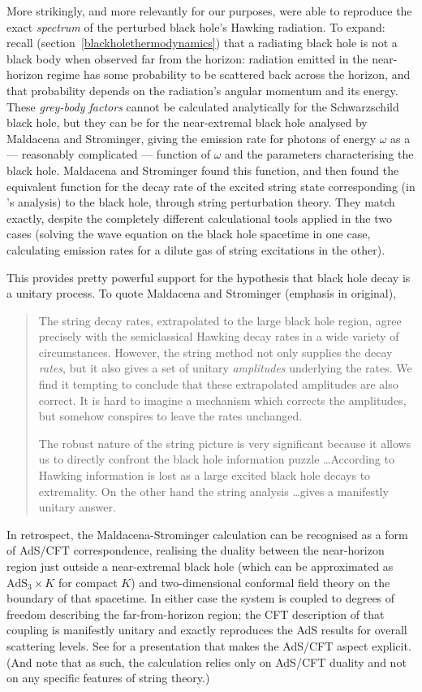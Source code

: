 \documentclass[12pt]{article}
\newcommand{\AdS}{\mbox{AdS}}
\begin{document}
More strikingly, and more relevantly for our purposes,  were able to reproduce the exact \emph{spectrum} of the perturbed black hole's Hawking radiation. To expand: recall (section~\ref{blackholethermodynamics}) that a radiating black hole is not  a black body when observed far from the horizon: radiation emitted in the near-horizon regime has some probability to be scattered back across the horizon, and that probability depends on the radiation's angular momentum and its energy. These \emph{grey-body factors} cannot be calculated analytically for the Schwarzschild black hole, but they can be for the near-extremal black hole analysed by Maldacena and Strominger, giving the emission rate for photons of energy $\omega$ as a --- reasonably complicated --- function of $\omega$ and the parameters characterising the black hole. Maldacena and Strominger found this function, and then found the equivalent function for the decay rate of the excited string state corresponding (in 's analysis) to the black hole, through string perturbation theory. They match exactly, despite the completely different calculational tools applied in the two cases (solving the wave equation on the black hole spacetime in one case, calculating emission rates for a dilute gas of string excitations in the other).

This provides pretty powerful support for the hypothesis that black hole decay is a unitary process. To quote Maldacena and Strominger (emphasis in original),
\begin{quote}
The string decay rates, extrapolated to the large black hole region, agree precisely with the semiclassical Hawking decay rates in a wide variety of circumstances. However, the string method not only supplies the decay \emph{rates}, but it also gives a set of unitary \emph{amplitudes} underlying the rates. We find it tempting to conclude that these extrapolated amplitudes are also correct. It is hard to imagine a mechanism which corrects the amplitudes, but somehow conspires to leave the rates unchanged.

The robust nature of the string picture is very significant because it allows us to directly confront the black hole information puzzle \ldots According to Hawking information is lost as a large excited black hole decays to extremality. On the other hand the string analysis \ldots gives a manifestly unitary answer.
\end{quote}

In retrospect, the Maldacena-Strominger calculation can be recognised as a form of AdS/CFT correspondence, realising the duality between the near-horizon region just outside a near-extremal black hole (which can be approximated as $\AdS_3 \times K$ for compact $K$) and two-dimensional conformal field theory on the boundary of that spacetime. In either case the system is coupled to degrees of freedom describing the far-from-horizon region; the CFT description of that coupling is manifestly unitary and exactly reproduces the AdS results for overall scattering levels. See  for a presentation that makes the AdS/CFT aspect explicit. (And note that as such, the calculation relies only on AdS/CFT duality and not on any specific features of string theory.)
\end{document}
